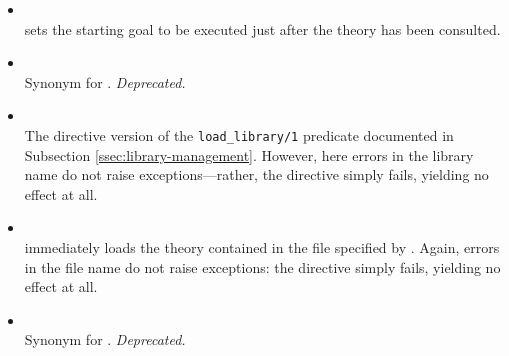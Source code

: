\begin{itemize}

\item {}\\
     \noindent{} sets the starting goal to be executed just
     after the theory has been consulted.


\item {}\\
     \noindent Synonym for . \emph{Deprecated.}


\item {}\\
     The directive version of the \texttt{load\_library/1} predicate documented in Subsection \ref{ssec:library-management}. However, here errors in the library name do not raise exceptions---rather, the directive simply fails, yielding no effect at all.

\item {}\\
     \noindent{} immediately loads the theory contained in the file specified by . Again, errors in the file name do not raise exceptions: the directive simply fails, yielding no effect at all.


\item {}\\
     \noindent Synonym for . \emph{Deprecated.}


\end{itemize}
